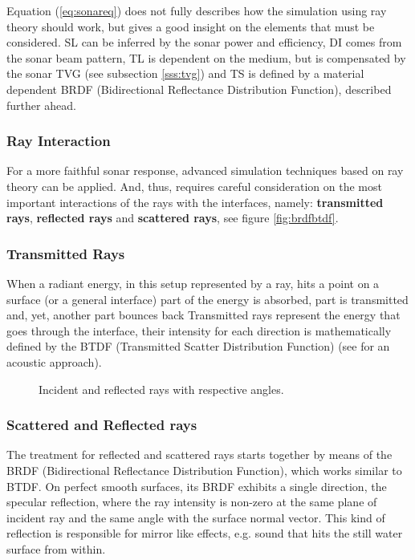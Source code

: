 Equation (\ref{eq:sonareq}) does not fully describes how the simulation
using ray theory should work, but gives a good insight on the elements that must
be considered. SL can be inferred by the sonar power and efficiency, DI comes
from the sonar beam pattern, TL is dependent on the medium, but is compensated
by the sonar TVG (see subsection \ref{sss:tvg}) and TS is defined by a material
dependent BRDF (Bidirectional Reflectance Distribution Function), described further ahead.

\subsubsection{Ray Interaction}

For a more faithful sonar response, advanced simulation techniques based on ray
theory can be applied. And, thus, requires careful consideration on the most
important interactions of the rays with the interfaces, namely:
\textbf{transmitted rays}, \textbf{reflected rays}  and \textbf{scattered rays},
see figure \ref{fig:brdfbtdf}.

\subsubsection{Transmitted Rays}
When a radiant energy, in this setup represented by a ray, hits a point on a
surface (or a general interface) part of the energy is absorbed, part is
transmitted and, yet, another part bounces back Transmitted rays represent the
energy that goes through the interface, their intensity for each direction is
mathematically defined by the BTDF (Transmitted Scatter Distribution
Function)\cite{bartell1981theory} (see \citet{rober2007ray} for an acoustic
approach).


\begin{figure}[h]
	\centering
	
	\caption{Incident and reflected rays with respective angles.}
	\label{fig:ray_reflect}
\end{figure}


\subsubsection{Scattered and Reflected rays}
\label{sss:rays}
The treatment for reflected and scattered rays starts together by means of the
BRDF (Bidirectional Reflectance Distribution
Function)\cite{blake1995remote,miller2015real,durany2015analytical}, which works
similar to BTDF. On perfect smooth surfaces, its BRDF exhibits a single
direction, the specular reflection, where the ray intensity is non-zero at the
same plane of incident ray and the same angle with the surface normal vector.
This kind of reflection is responsible for mirror like effects, e.g. sound that hits
the still water surface from within\cite{LURTON,Etter2013}.

